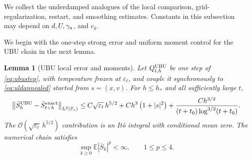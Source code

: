 \documentclass[11pt]{article}
\newtheorem{lemma}[theorem]{Lemma}
\theoremstyle{definition}
\newcommand{\E}{\mathbb E}
\newcommand{\eps}{\varepsilon}
\begin{document}
We collect the underdamped analogues of the local comparison,
grid-regularization, restart, and smoothing estimates. Constants in this
subsection may depend on $d,U,\gamma_{\rm u}$, and $c_h$.

We begin with the one-step strong error and uniform moment control for the
UBU chain in the next lemma.

\begin{lemma}[UBU local error and moments]\label{lem:ubulocal}
Let $Q^{\rm UBU}_{t,h}$ be one step of \eqref{eq:ubustep}, with temperature
frozen at $\eps_t$, and couple it synchronously to \eqref{eq:uldannealed}
started from $s=(x,v)$. For $h\leq h_*$ and all sufficiently large $t$,
\begin{equation}\label{eq:ubulocal}
 \left\|\bar S_h^{\rm UBU}-\bar S_{t+h}^{\rm exact}\right\|_{L^2(\mathbb P_s)}
 \leq C\sqrt{\eps_t}\,h^{5/2}
      +Ch^3\left(1+|s|^2\right)
      +\frac{Ch^{3/2}}{(t+t_0)\log^{3/2}(t+t_0)}.
\end{equation}
The $\mathcal{O}\left(\sqrt{\eps_t}\,h^{5/2}\right)$ contribution is an It\^o integral with
conditional mean zero. The numerical chain satisfies
\begin{equation}\label{eq:ubumoments}
 \sup_{k\geq0}\E\left|\bar S_k\right|^p<\infty,
 \qquad 1\leq p\leq4.
\end{equation}
\end{lemma}
\end{document}
